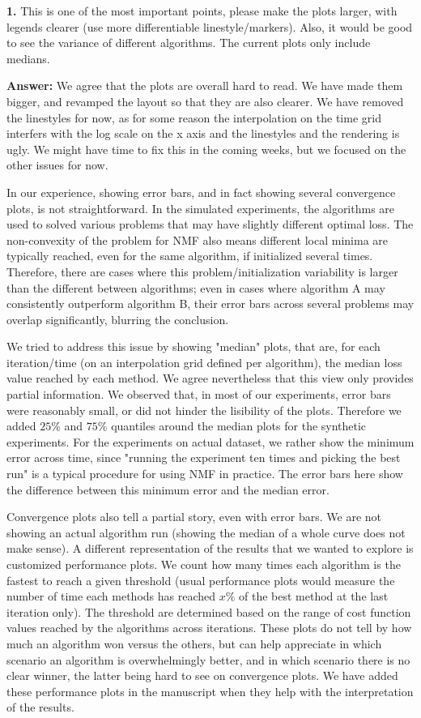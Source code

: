 \documentclass[10pt]{article} %
\newcommand{\answer}[1]{{\textbf{Answer:} \color{blue} #1}}
\begin{document}
\textbf{1.} This is one of the most important points, please make the plots larger, with legends clearer (use more differentiable linestyle/markers). Also, it would be good to see the variance of different algorithms. The current plots only include medians.

\answer{
We agree that the plots are overall hard to read. We have made them bigger, and revamped the layout so that they are also clearer. We have removed the linestyles for now, as for some reason the interpolation on the time grid interfers with the log scale on the x axis and the linestyles and the rendering is ugly. We might have time to fix this in the coming weeks, but we focused on the other issues for now.

In our experience, showing error bars, and in fact showing several convergence plots, is not straightforward. In the simulated experiments, the algorithms are used to solved various problems that may have slightly different optimal loss. The non-convexity of the problem for NMF also means different local minima are typically reached, even for the same algorithm, if initialized several times. Therefore, there are cases where this problem/initialization variability is larger than the different between algorithms; even in cases where algorithm A may consistently outperform algorithm B, their error bars across several problems may overlap significantly, blurring the conclusion. 

We tried to address this issue by showing "median" plots, that are, for each iteration/time (on an interpolation grid defined per algorithm), the median loss value reached by each method. We agree nevertheless that this view only provides partial information. We observed that, in most of our experiments, error bars were reasonably small, or did not hinder the lisibility of the plots. Therefore we added $25\%$ and $75\%$ quantiles around the median plots for the synthetic experiments. For the experiments on actual dataset, we rather show the minimum error across time, since "running the experiment ten times and picking the best run" is a typical procedure for using NMF in practice. The error bars here show the difference between this minimum error and the median error.

Convergence plots also tell a partial story, even with error bars. We are not showing an actual algorithm run (showing the median of a whole curve does not make sense). A different representation of the results that we wanted to explore is customized performance plots. We count how many times each algorithm is the fastest to reach a given threshold (usual performance plots would measure the number of time each methods has reached $x\%$ of the best method at the last iteration only). The threshold are determined based on the range of cost function values reached by the algorithms across iterations. These plots do not tell by how much an algorithm won versus the others, but can help appreciate in which scenario an algorithm is overwhelmingly better, and in which scenario there is no clear winner, the latter being hard to see on convergence plots. We have added these performance plots in the manuscript when they help with the interpretation of the results.

}
\end{document}
